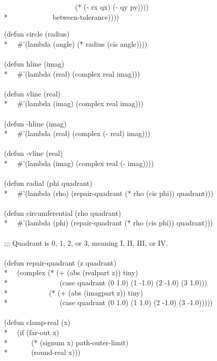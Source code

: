\begin{new}
\begin{lisp}
~~~~~~~~~~~~~~~~~~~~(* (- rx qx) (- qy py)))) \\*
~~~~~~~~~~~~between-tolerance))))
\end{lisp}
 \newpage%
\begin{lisp}
(defun circle (radius) \\*
~~\#'(lambda (angle) (* radius (cis angle)))) \\
\\
(defun hline (imag) \\*
~~\#'(lambda (real) (complex real imag))) \\
\\
(defun vline (real) \\*
~~\#'(lambda (imag) (complex real imag))) \\
\\
(defun -hline (imag) \\*
~~\#'(lambda (real) (complex (- real) imag))) \\
\\
(defun -vline (real) \\*
~~\#'(lambda (imag) (complex real (- imag)))) \\
\\
(defun radial (phi quadrant) \\*
~~\#'(lambda (rho) (repair-quadrant (* rho (cis phi)) quadrant))) \\
\\
(defun circumferential (rho quadrant) \\*
~~\#'(lambda (phi) (repair-quadrant (* rho (cis phi)) quadrant))) \\
\\
;;; Quadrant is 0, 1, 2, or 3, meaning I, II, III, or IV. \\
\\
(defun repair-quadrant (z quadrant) \\*
~~(complex (* (+ (abs (realpart z)) tiny) \\*
~~~~~~~~~~~~~~(case quadrant (0 1.0) (1 -1.0) (2 -1.0) (3 1.0))) \\*
~~~~~~~~~~~(* (+ (abs (imagpart z)) tiny) \\*
~~~~~~~~~~~~~~(case quadrant (0 1.0) (1 1.0) (2 -1.0) (3 -1.0))))) \\
\\
(defun clamp-real (x) \\*
~~(if (far-out x) \\*
~~~~~~(* (signum x) path-outer-limit) \\*
~~~~~~(round-real x))) \\

\end{lisp}
\end{new}
